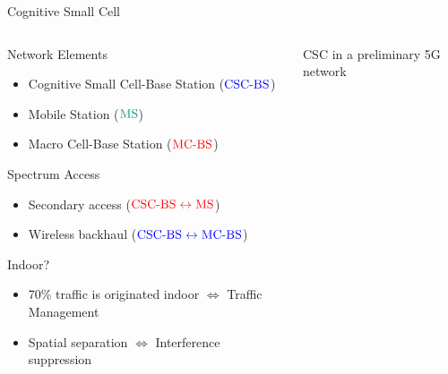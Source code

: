 \documentclass[16pt]{beamer}
\newcommand{\fs}[2]{\fontsize{#1 pt}{#2}\selectfont}
\begin{document}
\begin{frame}[t]{Cognitive Small Cell}
		\vspace{-0.1cm}
		\fs{8}{8}
	\begin{columns}
	\begin{column}{0.37\columnwidth}
		\vspace{-0.1cm}
		\onslide<2->
		{	
			\begin{block}{\footnotesize Network Elements}
				\begin{itemize}
					\item Cognitive Small Cell-Base Station ($\color{blue}{\text{CSC-BS}}$)
					\item Mobile Station ($\color{kit-green100}{\text{MS}}$) 
					\item Macro Cell-Base Station ($\color{red}{\text{MC-BS}}$) 
				\end{itemize}
			\end{block}
		}
		{
			\begin{block}{\footnotesize Spectrum Access}
				\begin{itemize}
					\item Secondary access ($\color{red}{\text{CSC-BS} \leftrightarrow \text{MS}}$) 
					\item Wireless backhaul ($\color{blue}{\text{CSC-BS} \leftrightarrow \text{MC-BS}}$)
				\end{itemize}
			\end{block}
		}
		{
			\begin{block}{\scriptsize Indoor?}
				\begin{itemize}
					\item 70\% traffic is originated indoor $\Leftrightarrow$ Traffic Management
					\item Spatial separation $\Leftrightarrow$ Interference suppression	
				\end{itemize}
			\end{block}
		}
	\end{column}
	\begin{column}{0.63\columnwidth}
		\fs{8}{8}
		\begin{center}
			CSC in a preliminary 5G network \\\vspace{0.4cm} 

\end{center}
\end{column}
\end{columns}
\end{frame}
\end{document}
